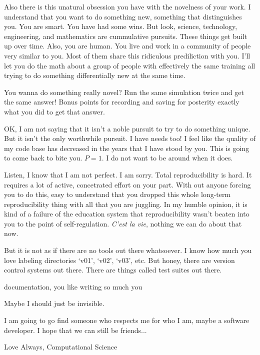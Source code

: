 \documentclass[final,10pt]{elsarticle}
\begin{document}
Also there is this unatural obsession you have with the novelness of your work.
I understand that you want to do something new, something that distinguishes you.
You are smart. You have had some wins.  But look, science, technology, engineering, 
and mathematics are cummulative pursuits.  These things get built up over time.
Also, you are human.  You live and work in a community of people very similar to you.  
Most of them share this ridiculous prediliction with you.  I'll let you do the math
about a group of people with effectively the same training all trying to do something
differentially new at the same time.

You wanna do something really novel?  Run the same simulation twice and get the same
answer!  Bonus points for recording and saving for posterity exactly what you did to
get that answer.

OK, I am not saying that it isn't a noble pursuit to try to do something unique.  
But it isn't the only worthwhile pursuit.  I have needs too!  I feel like the quality
of my code base has decreased in the years that I have stood by you.  This is going
to come back to bite you.  $P=1$. I do not want to be around when it does.

Listen, I know that I am not perfect.  I am sorry.  Total reproducibility is hard.
It requires a lot of active, concetrated effort on your part.  With out anyone 
forcing you to do this, easy to understand that you dropped this whole long-term
reproducibility thing with all that you are juggling.  In my humble opinion, it is
kind of a failure of the education system that reproducibility wasn't beaten into you
to the point of self-regulation.  \emph{C'est la vie}, nothing we can do about that
now.

But it is not as if there are no tools out there whatsoever.  I know how much you
love labeling directories `v01', `v02', `v03', etc.  But honey, there are version 
control systems out there.  There are things called test suites out there. 

documentation, you like writing so much you 

Maybe I should just be invisible.

I am going to go find someone who respects me for who I am, maybe a software 
developer.  I hope that we can still be friends...

Love Always, Computational Science



%
\end{document}
